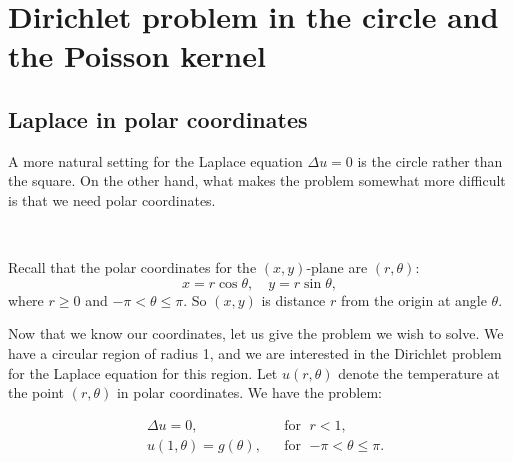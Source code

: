%


\sectionnewpage
\section{Dirichlet problem in the circle and the Poisson kernel}
\label{dirichdisc:section}


\subsection{Laplace in polar coordinates}

A more natural setting for the Laplace equation $\Delta u = 0$
is the circle rather than the square.  On the other hand, what makes the
problem somewhat more difficult is that we need polar coordinates.

\begin{diffyfloatingfigurer}{1.3in}{1.5in}
\noindent
{}
\\
\end{diffyfloatingfigurer}
Recall that the polar coordinates for the $(x,y)$-plane are $(r,\theta)$: 
\begin{equation*}
x = r \cos \theta , \quad y = r \sin \theta ,
\end{equation*}
where $r \geq 0$ and $-\pi < \theta \leq \pi$.  So $(x,y)$ is
distance $r$ from the origin at angle $\theta$.

Now that we know our coordinates, let us give the problem we wish
to solve.  We have a circular region of radius 1, and we are interested
in the Dirichlet problem for the Laplace equation for this region.  Let
$u(r,\theta)$ denote the temperature at the point $(r,\theta)$ in polar
coordinates.  We have the problem:
\begin{diffyfloatingfigurer}{2.4in}{2.7in}
\noindent
{}
\end{diffyfloatingfigurer}
\begin{equation} \label{dirichdisc:theprobeq}
\begin{aligned}
& \Delta u = 0 , & & \text{for } \; r < 1, \\
& u(1,\theta) = g(\theta), & & \text{for } \; {-\pi} < \theta \leq \pi.
\end{aligned}
\end{equation}

